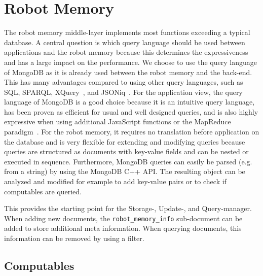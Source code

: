 \section{Robot Memory}
\label{sec:impl-memory}
The robot memory middle-layer implements most functions exceeding a
typical database.
A central question is which query language should be used between
applications and the robot memory because this determines the
expressiveness and has a large impact on the performance. We choose to
use the query language of MongoDB as it is already used between the
robot memory and the back-end. This has many advantages compared to
using other query languages, such as SQL, SPARQL,
XQuery~\cite{query-languages}, and JSONiq~\cite{jsoniq}.
%
For the application view, the query language of MongoDB is a good
choice because it is an intuitive query language, has been proven as
efficient for usual and well designed queries, and is also highly
expressive when using additional JavaScript functions or the MapReduce
paradigm~\cite{mongodb,RoboDB}. For the robot memory, it requires no
translation before application on the database and is very flexible
for extending and modifying queries because queries are structured as
documents with key-value fields and can be nested or executed in
sequence. Furthermore, MongoDB queries can easily be parsed (e.g. from
a string) by using the MongoDB C++ API. The resulting object can be
analyzed and modified for example to add key-value pairs or to check
if computables are queried.

This provides the starting point for the Storage-, Update-, and
Query-manager. When adding new documents, the
\texttt{robot\_memory\_info} sub-document can be added to store
additional meta information. When querying documents, this information
can be removed by using a filter. 


\subsection{Computables}

